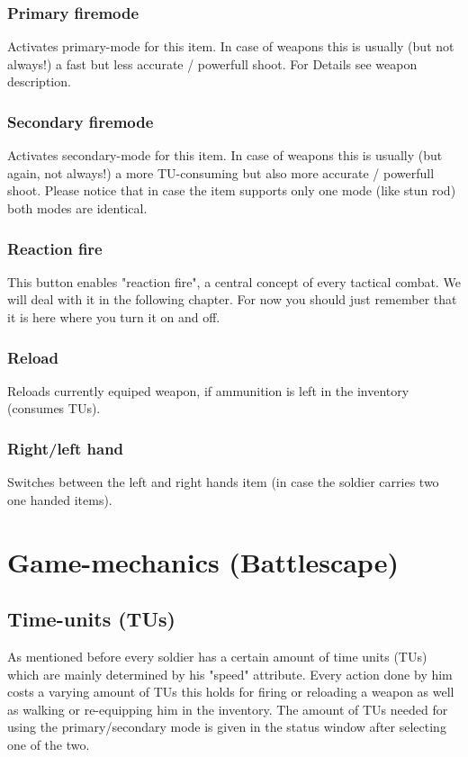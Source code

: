 \subsubsection{Primary firemode}
Activates primary-mode for this item. In case of weapons this is usually (but not always!) a fast but less accurate / powerfull shoot. For Details see weapon description.
\subsubsection{Secondary firemode}
Activates secondary-mode for this item. In case of weapons this is usually (but again, not always!) a more TU-consuming but also more accurate / powerfull shoot. Please notice that in case the item supports only one mode (like stun rod) both modes are identical.
\subsubsection{Reaction fire}
This button enables "reaction fire", a central concept of every tactical combat. We will deal with it in the following chapter. For now you should just remember that it is here where you turn it on and off.
\subsubsection{Reload}
Reloads currently equiped weapon, if ammunition is left in the inventory (consumes TUs).
\subsubsection{Right/left hand}
Switches between the left and right hands item (in case the soldier carries two one handed items).

\section{Game-mechanics (Battlescape)}

\subsection{Time-units (TUs)}
As mentioned before every soldier has a certain amount of time units (TUs) which are mainly determined by his "speed" attribute. Every action done by him costs a varying amount of TUs this holds for firing or reloading a weapon as well as walking or re-equipping him in the inventory. The amount of TUs needed for using the primary/secondary mode is given in the status window after selecting one of the two.

